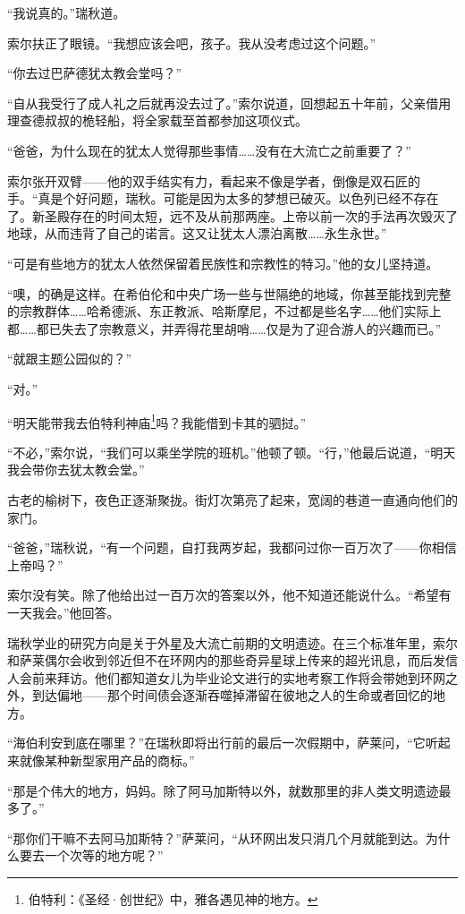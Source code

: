 \documentclass[AutoFakeBold=true]{book}
\begin{document}
``我说真的。''瑞秋道。

索尔扶正了眼镜。``我想应该会吧，孩子。我从没考虑过这个问题。''

``你去过巴萨德犹太教会堂吗？''

``自从我受行了成人礼之后就再没去过了。''索尔说道，回想起五十年前，父亲借用理查德叔叔的桅轻船，将全家载至首都参加这项仪式。

``爸爸，为什么现在的犹太人觉得那些事情……没有在大流亡之前重要了？''

索尔张开双臂——他的双手结实有力，看起来不像是学者，倒像是双石匠的手。``真是个好问题，瑞秋。可能是因为太多的梦想已破灭。以色列已经不存在了。新圣殿存在的时间太短，远不及从前那两座。上帝以前一次的手法再次毁灭了地球，从而违背了自己的诺言。这又让犹太人漂泊离散……永生永世。''

``可是有些地方的犹太人依然保留着民族性和宗教性的特习。''他的女儿坚持道。

``噢，的确是这样。在希伯伦和中央广场一些与世隔绝的地域，你甚至能找到完整的宗教群体……哈希德派、东正教派、哈斯摩尼，不过都是些名字……他们实际上都……都已失去了宗教意义，并弄得花里胡哨……仅是为了迎合游人的兴趣而已。''

``就跟主题公园似的？''

``对。''

``明天能带我去伯特利神庙\footnote{伯特利：《圣经·创世纪》中，雅各遇见神的地方。}吗？我能借到卡其的驷挝。''

``不必，''索尔说，``我们可以乘坐学院的班机。''他顿了顿。``行，''他最后说道，``明天我会带你去犹太教会堂。''

古老的榆树下，夜色正逐渐聚拢。街灯次第亮了起来，宽阔的巷道一直通向他们的家门。

``爸爸，''瑞秋说，``有一个问题，自打我两岁起，我都问过你一百万次了——你相信上帝吗？''

索尔没有笑。除了他给出过一百万次的答案以外，他不知道还能说什么。``希望有一天我会。''他回答。

瑞秋学业的研究方向是关于外星及大流亡前期的文明遗迹。在三个标准年里，索尔和萨莱偶尔会收到邻近但不在环网内的那些奇异星球上传来的超光讯息，而后发信人会前来拜访。他们都知道女儿为毕业论文进行的实地考察工作将会带她到环网之外，到达偏地——那个时间债会逐渐吞噬掉滞留在彼地之人的生命或者回忆的地方。

``海伯利安到底在哪里？''在瑞秋即将出行前的最后一次假期中，萨莱问，``它听起来就像某种新型家用产品的商标。''

``那是个伟大的地方，妈妈。除了阿马加斯特以外，就数那里的非人类文明遗迹最多了。''

``那你们干嘛不去阿马加斯特？''萨莱问，``从环网出发只消几个月就能到达。为什么要去一个次等的地方呢？''
\end{document}
